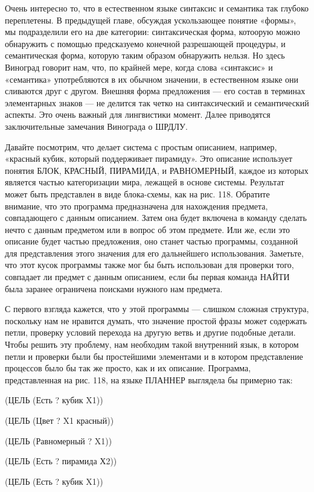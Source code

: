 \documentclass[../main.tex]{subfiles}
\begin{document}
Очень интересно то, что в естественном языке синтаксис и семантика так глубоко переплетены. В предыдущей главе, обсуждая ускользающее понятие «формы», мы подразделили его на две категории: синтаксическая форма, котоорую можно обнаружить с помощью предсказуемо конечной разрешающей процедуры, и семантическая форма, которую таким образом обнаружить нельзя. Но здесь Виноград говорит нам, что, по крайней мере, когда слова «синтаксис» и «семантика» употребляются в их обычном значении, в естественном языке они сливаются друг с другом. Внешняя форма предложения --- его состав в терминах элементарных знаков --- не делится так четко на синтаксический и семантический аспекты. Это очень важный для лингвистики момент. Далее приводятся заключительные замечания Винограда о ШРДЛУ.

Давайте посмотрим, что делает система с простым описанием, например, «красный кубик, который поддерживает пирамиду». Это описание использует понятия БЛОК, КРАСНЫЙ, ПИРАМИДА, и РАВНОМЕРНЫЙ, каждое из которых является частью категоризации мира, лежащей в основе системы. Результат может быть представлен в виде блока-схемы, как на рис. 118. Обратите внимание, что это программа предназначена для нахождения предмета, совпадающего с данным описанием. Затем она будет включена в команду сделать нечто с данным предметом или в вопрос об этом предмете. Или же, если это описание будет частью предложения, оно станет частью программы, созданной для представления этого значения для его дальнейшего использования. Заметьте, что этот кусок программы также мог бы быть использован для проверки того, совпадает ли предмет с данным описанием, если бы первая команда НАЙТИ была заранее ограничена поисками нужного нам предмета.

С первого взгляда кажется, что у этой программы --- слишком сложная структура, поскольку нам не нравится думать, что значение простой фразы может содержать петли, проверку условий перехода на другую ветвь и другие подобные детали. Чтобы решить эту проблему, нам необходим такой внутренний язык, в котором петли и проверки были бы простейшими элементами и в котором представление процессов было бы так же просто, как и их описание. Программа, представленная на рис. 118, на языке ПЛАННЕР выглядела бы примерно так:

(ЦЕЛЬ (Есть ? кубик X1))

(ЦЕЛЬ (Цвет ? X1 красный))

(ЦЕЛЬ (Равномерный ? X1))

(ЦЕЛЬ (Есть ? пирамида Х2))

(ЦЕЛЬ (Есть ? кубик X1))
\end{document}
